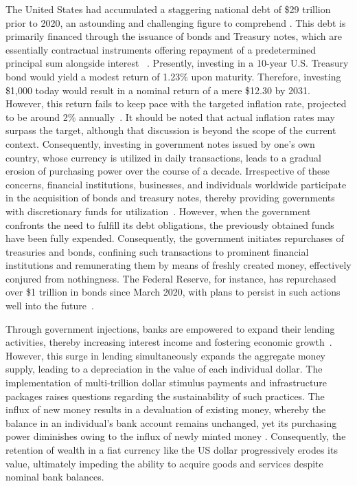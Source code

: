 The United States had accumulated a staggering national debt of \$29 trillion prior to 2020, an astounding and challenging
figure to comprehend \cite{usdebt}. This debt is primarily financed through the issuance of bonds and Treasury notes, which
are essentially contractual instruments offering repayment of a predetermined principal sum alongside interest
~\cite{treasurysecurities}. Presently, investing in a 10-year U.S. Treasury bond would yield a modest return of 1.23\%
upon maturity. Therefore, investing \$1,000 today would result in a nominal return of a mere \$12.30 by 2031. However,
this return fails to keep pace with the targeted inflation rate, projected to be around 2\% annually~\cite{frbinflation}.
It should be noted that actual inflation rates may surpass the target, although that discussion is beyond the scope of the
current context. Consequently, investing in government notes issued by one's own country, whose currency is utilized in
daily transactions, leads to a gradual erosion of purchasing power over the course of a decade. Irrespective of these concerns,
financial institutions, businesses, and individuals worldwide participate in the acquisition of bonds and treasury notes,
thereby providing governments with discretionary funds for utilization~\cite{treasurysecurities}. However, when the government
confronts the need to fulfill its debt obligations, the previously obtained funds have been fully expended. Consequently,
the government initiates repurchases of treasuries and bonds, confining such transactions to prominent financial institutions
and remunerating them by means of freshly created money, effectively conjured from nothingness. The Federal Reserve, for
instance, has repurchased over \$1 trillion in bonds since March 2020, with plans to persist in such actions well into the
future~\cite{federalreserve}.

Through government injections, banks are empowered to expand their lending activities, thereby increasing interest income
and fostering economic growth~\cite{federalreserve}. However, this surge in lending simultaneously expands the aggregate
money supply, leading to a depreciation in the value of each individual dollar. The implementation of multi-trillion dollar
stimulus payments and infrastructure packages raises questions regarding the sustainability of such practices. The influx
of new money results in a devaluation of existing money, whereby the balance in an individual's bank account remains unchanged,
yet its purchasing power diminishes owing to the influx of newly minted money \cite{currencydevaluation}. Consequently,
the retention of wealth in a fiat currency like the US dollar progressively erodes its value, ultimately impeding the ability
to acquire goods and services despite nominal bank balances.


